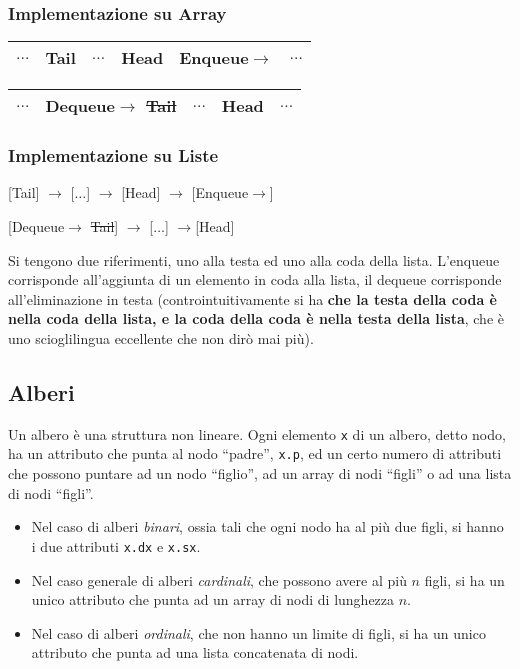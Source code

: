 \documentclass[a4paper,10pt]{article}
\theoremstyle{definition}
\begin{document}
\subsubsection{Implementazione su Array}
\begin{center}
\begin{tabular}{|c |c|c|c|c|c|}
 \hline
  $\hdots$ & \footnotesize Tail & $\hdots$ &\footnotesize Head& \footnotesize Enqueue$\rightarrow $& $\hdots$\\
 \hline
\end{tabular} \hspace{10mm}\begin{tabular}{|c|c|c|c|c|}
 \hline
  $\hdots$ & \footnotesize Dequeue$\rightarrow $ \st{Tail} & $\hdots$ &\footnotesize Head & $\hdots$\\
 \hline
\end{tabular} 
\end{center}
\subsubsection{Implementazione su Liste}
\begin{center}
   [\footnotesize Tail] $\longrightarrow$ [$\hdots$] $\longrightarrow$ [\footnotesize Head] $\longrightarrow$ \footnotesize [Enqueue$\rightarrow $]\bigskip

  [\footnotesize Dequeue$\rightarrow $ \st{Tail}] $\longrightarrow$ [$\hdots$] $\longrightarrow$[\footnotesize Head]
\end{center}

Si tengono due riferimenti, uno alla testa ed uno alla coda della lista. L'enqueue corrisponde all'aggiunta di un elemento in coda alla lista, il dequeue corrisponde all'eliminazione in testa (controintuitivamente si ha \textbf{che la testa della coda è nella coda della lista, e la coda della coda è nella testa della lista}, che è uno scioglilingua eccellente che non dirò mai più).
\subsection{Alberi}
Un albero è una struttura non lineare. Ogni elemento \texttt{x} di un albero, detto nodo, ha un attributo che punta al nodo ``padre'', \texttt{x.p}, ed un certo numero di attributi che possono puntare ad un nodo ``figlio'', ad un array di nodi ``figli'' o ad una lista di nodi ``figli''.

\begin{itemize}
 \item Nel caso di alberi \emph{binari}, ossia tali che ogni nodo ha al più due figli, si hanno i due attributi \texttt{x.dx} e \texttt{x.sx}.
 \item Nel caso generale di alberi \emph{cardinali}, che possono avere al più $n$ figli, si ha un unico attributo che punta ad un array di nodi di lunghezza $n$.
 \item Nel caso di alberi \emph{ordinali}, che non hanno un limite di figli, si ha un unico attributo che punta ad una lista concatenata di nodi.
\end{itemize}
\end{document}
